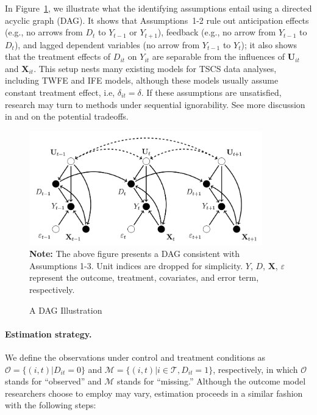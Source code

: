 \documentclass[12pt]{article}
\let\oldcenter\center
\let\oldendcenter\endcenter
\renewenvironment{center}{\setlength\topsep{0pt}\oldcenter}{\oldendcenter}
\begin{document}
In Figure~\ref{fg.dag}, we illustrate what the identifying assumptions entail using a directed acyclic graph (DAG). It shows that Assumptions~1-2  rule out anticipation effects (e.g., no arrows from $D_{t}$ to $Y_{t-1}$ or $Y_{t+1}$), feedback (e.g., no arrow from $Y_{t-1}$ to $D_{t}$), and lagged dependent variables (no arrow from $Y_{t-1}$ to $Y_{t}$); it also shows that the treatment effects of $D_{it}$ on $Y_{it}$ are separable from the influences of $\mathbf{U}_{it}$ and $\mathbf{X}_{it}$. This setup nests many existing models for TSCS data analyses, including TWFE and IFE models, although these models usually assume constant treatment effect, i.e, $\delta_{it} = \delta$. If these assumptions are unsatisfied, research may turn to methods under sequential ignorability. See more discussion in \citet{blackwell2018make} and \citet{ImaiKim2019} on the potential tradeoffs.

\begin{figure}[!ht]\caption{A DAG Illustration\label{fg.dag}}
\begin{center}
\begin{minipage}{0.85\linewidth}
\begin{center}\vspace{-0.5em}
\includegraphics[width = 0.9\textwidth]{DAG.png}
\end{center}
\footnotesize\textbf{Note:} The above figure presents a DAG consistent with Assumptions 1-3. Unit indices are dropped for simplicity. $Y$, $D$, $\mathbf{X}$, $\varepsilon$ represent the outcome, treatment, covariates, and error term, respectively.
\end{minipage}
\end{center}\vspace{-1em}
\end{figure}


\paragraph{Estimation strategy.} We define the observations under control and treatment conditions as $\mathcal{O} = \{(i,t)| D_{it} = 0\}$ and $\mathcal{M} = \{(i,t)| i\in\mathcal{T}, D_{it} = 1\}$, respectively, in which $\mathcal{O}$ stands for ``observed'' and $\mathcal{M}$ stands for  ``missing.'' Although the outcome model researchers choose to employ may vary, estimation proceeds in a similar fashion with the following steps:
\end{document}
